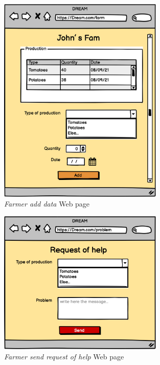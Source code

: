 \begin{figure}[H]
    \begin{center}
    \includegraphics[width=0.7\textwidth]{mockups/AddData.png}
    \caption{\emph{Farmer add data} Web page}
    \label{fig:addData}
    \end{center}
\end{figure}

\begin{figure}[H]
    \begin{center}
    \includegraphics[width=0.7\textwidth]{mockups/Help.png}
    \caption{\emph{Farmer send request of help} Web page}
    \label{fig:helpRequest}
    \end{center}
\end{figure}


